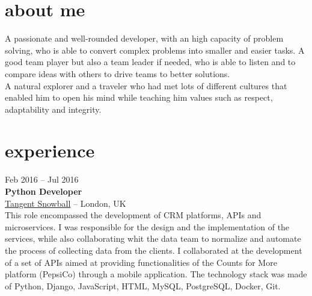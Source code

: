 \documentclass[]{friggeri-cv}
\begin{document}
\section{about me}
{
A passionate and well-rounded developer, with an high capacity of problem solving, who is able to convert complex problems into smaller and easier tasks. A good team player but also a team leader if needed, who is able to listen and to compare ideas with others to drive teams to better solutions. \\
A natural explorer and a traveler who had met lots of different cultures that enabled him to open his mind while teaching him values such as respect, adaptability and integrity.}


\section{experience}

{Feb 2016 -- Jul 2016} \\
{\textbf{Python Developer}} \\
{\href{http://www.tangentsnowball.com}{Tangent Snowball}} -- {London, UK} \\
{This role encompassed the development of CRM platforms, APIs and microservices. I was responsible for the design and the implementation of the services, while also collaborating whit the data team to normalize and automate the process of collecting data from the clients.
I collaborated at the development of a set of APIs aimed at providing functionalities of the Counts for More platform (PepsiCo) through a mobile application.
The technology stack was made of Python, Django, JavaScript, HTML, MySQL, PostgreSQL, Docker, Git.}
\end{document}
